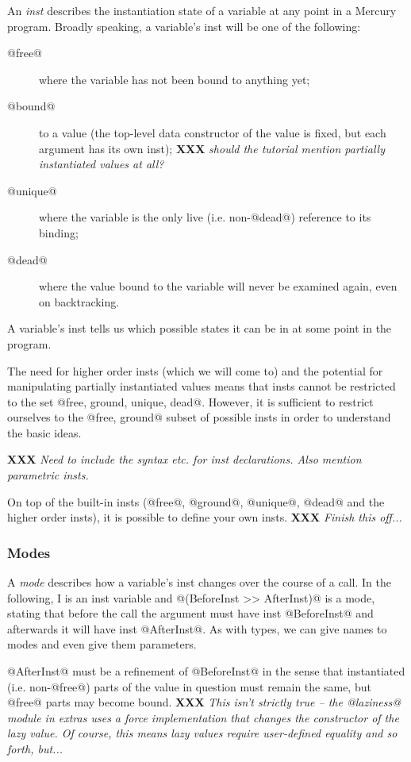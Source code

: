\documentclass[a4paper,11pt,notitlepage,onecolumn]{article}
\newcommand{\XXX}[1]%
{{\small\textbf{XXX} \emph{#1}}}
\begin{document}
An \emph{inst} describes the instantiation state of a variable
at any point in a Mercury program.  Broadly speaking, a
variable's inst will be one of the following:
\begin{description}
\item[@free@] where the variable has not been bound to anything yet;
\item[@bound@] to a value (the top-level
  data constructor of the value is fixed, but each argument has its own
  inst);
  \XXX{should the tutorial mention partially instantiated
  values at all?}
\item[@unique@] where the variable is the only live (i.e. non-@dead@)
  reference to its binding;
\item[@dead@] where the value bound to the variable will never be
  examined again, even on backtracking.
\end{description}

A variable's inst tells us which possible states it can be
in at some point in the program.

The need for higher order insts (which we will come to)
and the potential for manipulating partially instantiated
values means that insts cannot be restricted to the set
@{free, ground, unique, dead}@.  However, it is sufficient
to restrict ourselves to the @{free, ground}@ subset of
possible insts in order to understand the basic ideas.

\XXX{Need to include the syntax etc. for inst
declarations.  Also mention parametric insts.}

On top of the built-in insts (@free@, @ground@, @unique@, @dead@
and the higher order insts), it is possible to define your
own insts.  \XXX{Finish this off...}

\subsubsection{Modes}

A \emph{mode} describes how a variable's inst changes over the
course of a call.  In the following, I is an inst
variable and @(BeforeInst >> AfterInst)@ is a mode, stating
that before the call the argument must have inst
@BeforeInst@ and afterwards it will have inst @AfterInst@.  As
with types, we can give names to modes and even give them
parameters.

@AfterInst@ must be a refinement of @BeforeInst@ in the sense
that instantiated (i.e. non-@free@) parts of the value in
question must remain the same, but @free@ parts may become
bound.  \XXX{This isn't strictly true -- the @laziness@
module in extras uses a force implementation that changes
the constructor of the lazy value.  Of course, this means
lazy values require user-defined equality and so forth,
but...}
\end{document}
